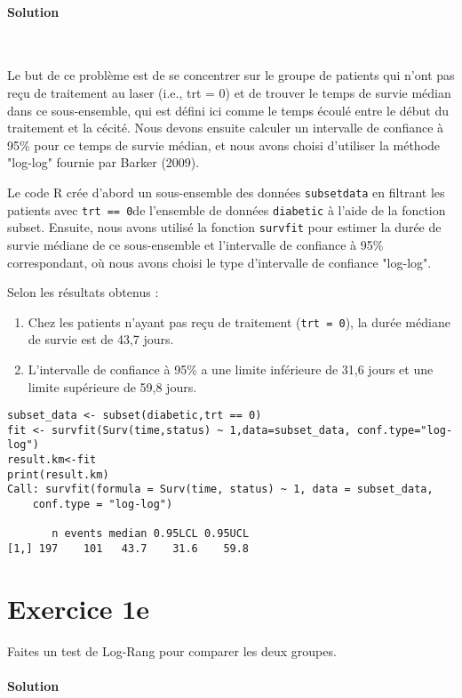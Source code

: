 \documentclass[../main.tex]{subfiles}
\begin{document}
\begin{CJK*}{UTF8}{gbsn}
\paragraph{Solution}\

Le but de ce problème est de se concentrer sur le groupe de patients qui n'ont pas reçu de traitement au laser (i.e., trt = 0) et de trouver le temps de survie médian dans ce sous-ensemble, qui est défini ici comme le temps écoulé entre le début du traitement et la cécité. Nous devons ensuite calculer un intervalle de confiance à 95\% pour ce temps de survie médian, et nous avons choisi d'utiliser la méthode "log-log" fournie par Barker (2009).

Le code R crée d'abord un sous-ensemble des données \texttt{subsetdata} en filtrant les patients avec \texttt{trt == 0}de l'ensemble de données \texttt{diabetic} à l'aide de la fonction subset. Ensuite, nous avons utilisé la fonction \texttt{survfit} pour estimer la durée de survie médiane de ce sous-ensemble et l'intervalle de confiance à 95\% correspondant, où nous avons choisi le type d'intervalle de confiance "log-log".

Selon les résultats obtenus :
\begin{enumerate}
  \item Chez les patients n'ayant pas reçu de traitement (\texttt{trt = 0}), la durée médiane de survie est de 43,7 jours.
  \item L'intervalle de confiance à 95\% a une limite inférieure de 31,6 jours et une limite supérieure de 59,8 jours.
\end{enumerate}

\begin{lstlisting}
subset_data <- subset(diabetic,trt == 0)
fit <- survfit(Surv(time,status) ~ 1,data=subset_data, conf.type="log-log")
result.km<-fit
print(result.km)
Call: survfit(formula = Surv(time, status) ~ 1, data = subset_data, 
    conf.type = "log-log")

       n events median 0.95LCL 0.95UCL
[1,] 197    101   43.7    31.6    59.8
\end{lstlisting}

\section*{Exercice 1e}
Faites un test de Log-Rang pour comparer les deux groupes.

\paragraph{Solution}\


\end{CJK*}
\end{document}
